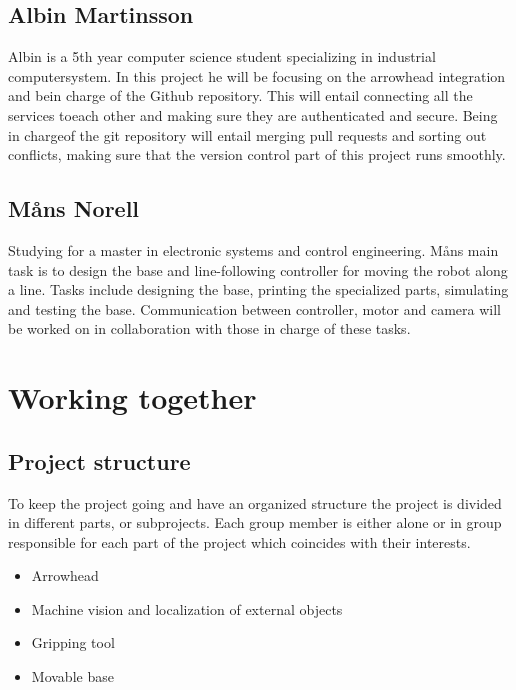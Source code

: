 \section*{Albin Martinsson}
Albin is a 5th year computer science student specializing in industrial computersystem. 
In this project he will be focusing on the arrowhead integration and bein charge of the Github repository.  
This will entail connecting all the services toeach other and making sure they are authenticated and secure.  
Being in chargeof the git repository will entail merging pull requests and sorting out conflicts,
making sure that the version control part of this project runs smoothly.


\section*{Måns Norell}
Studying for a master in electronic systems and control engineering.
Måns main task is to design the base and line-following controller for moving the robot along a line. 
Tasks include designing the base, printing the specialized parts, simulating and testing the base.
Communication between controller, motor and camera will be worked on in collaboration with those in charge of these tasks. 

\chapter{Working together}
\section*{Project structure}
To keep the project going and have an organized structure the project is divided 
in different parts, or subprojects. Each group member is either alone or in group responsible for each part of the project which coincides with their interests. 
\begin{itemize}
    \item Arrowhead
    \item Machine vision and localization of external objects
    \item Gripping tool
    \item Movable base
\end{itemize}


